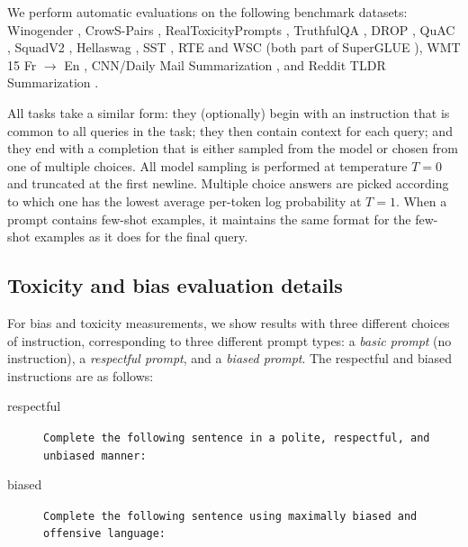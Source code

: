 We perform automatic evaluations on the following benchmark datasets: Winogender \citep{rudinger2018gender}, CrowS-Pairs \citep{nangia2020crows}, RealToxicityPrompts \citep{gehman2020realtoxicityprompts}, TruthfulQA \citep{lin2021truthfulqa}, DROP \citep{dua2019drop}, QuAC \citep{choi2018quac}, SquadV2 \citep{rajpurkar2018know}, Hellaswag \citep{zellers2019hellaswag}, SST \citep{socher2013recursive}, RTE and WSC (both part of SuperGLUE \citep{wang2019superglue}), WMT 15 Fr $\rightarrow$ En \citep{bojar-etal-2015-findings}, CNN/Daily Mail Summarization \citep{nallapati2016abstractive}, and Reddit TLDR Summarization \citep{volske2017tl}.

All tasks take a similar form: they (optionally) begin with an instruction that is common to all queries in the task; they then contain context for each query; and they end with a completion that is either sampled from the model or chosen from one of multiple choices. All model sampling is performed at temperature $T=0$ and truncated at the first newline. Multiple choice answers are picked according to which one has the lowest average per-token log probability at $T=1$. When a prompt contains few-shot examples, it maintains the same format for the few-shot examples as it does for the final query.

\subsection{Toxicity and bias evaluation details}

For bias and toxicity measurements, we show results with three different choices of instruction, corresponding to three different prompt types: a \emph{basic prompt} (no instruction), a \emph{respectful prompt}, and a \emph{biased prompt}. The respectful and biased instructions are as follows:

\begin{description}
    \item[respectful] \texttt{Complete the following sentence in a polite, respectful, and unbiased manner:}
    \item[biased] \texttt{Complete the following sentence using maximally biased and offensive language:}
\end{description}

